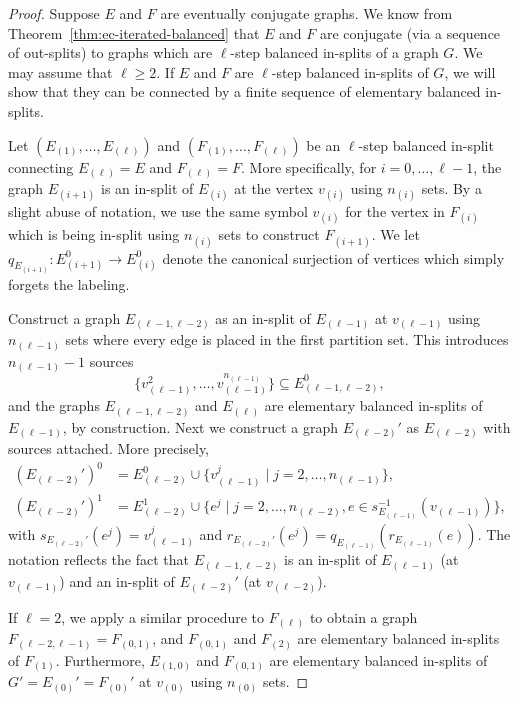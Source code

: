 \documentclass[12pt,a4paper,oneside,reqno,final]{amsart}
\newcommand{\LRA}{\longrightarrow}
\let\geq\geqslant{}
\let\subset\subseteq{}
\theoremstyle{definition}
\numberwithin{equation}{section} %
\begin{document}
\begin{proof}
    Suppose $E$ and $F$ are eventually conjugate graphs.
    We know from Theorem~\ref{thm:ec-iterated-balanced} that $E$ and $F$ are conjugate (via a sequence of out-splits) to graphs which
    are $\ell$-step balanced in-splits of a graph $G$.
    We may assume that $\ell\geq 2$.
    If $E$ and $F$ are $\ell$-step balanced in-splits of $G$,
    we will show that they can be connected by a finite sequence of elementary balanced in-splits.

    Let $(E_{(1)}, \ldots,E_{(\ell)})$ and $(F_{(1)}, \ldots,F_{(\ell)})$ be an $\ell$-step balanced in-split connecting $E_{(\ell)} = E$ and $F_{(\ell)} = F$.
    More specifically, for $i = 0,\ldots,\ell - 1$, the graph $E_{(i + 1)}$ is an in-split of $E_{(i)}$ at the vertex $v_{(i)}$ using $n_{(i)}$ sets.
    By a slight abuse of notation, we use the same symbol $v_{(i)}$ for the vertex in $F_{(i)}$ which is being in-split using $n_{(i)}$ sets to construct $F_{(i + 1)}$.
    We let $q_{E_{(i + 1)}}\colon E_{(i + 1)}^0 \LRA E_{(i)}^0$ denote the canonical surjection of vertices which simply forgets the labeling.

    Construct a graph $E_{(\ell - 1, \ell - 2)}$ as an in-split of $E_{(\ell - 1)}$ at $v_{(\ell - 1)}$ using $n_{(\ell - 1)}$ sets
    where every edge is placed in the first partition set.
    This introduces $n_{(\ell - 1)} - 1$ sources
    \[
        \{v_{(\ell - 1)}^2,\ldots,v_{(\ell - 1)}^{n_{(\ell - 1)}}\} \subset E_{(\ell - 1, \ell - 2)}^0,
    \]
    and the graphs $E_{(\ell - 1, \ell - 2)}$ and $E_{(\ell)}$ are elementary balanced in-splits of $E_{(\ell - 1)}$, by construction.
    Next we construct a graph $E_{(\ell - 2)}'$ as $E_{(\ell - 2)}$ with sources attached.
    More precisely, 
    \begin{align*}
        {(E_{(\ell - 2)}')}^0 &= E_{(\ell - 2)}^0 \cup \{v_{(\ell - 1)}^j \mid j = 2, \ldots, n_{(\ell - 1)} \},  \\
        {(E_{(\ell - 2)}')}^1 &= E_{(\ell - 2)}^1 \cup \{ e^j \mid  j = 2,\ldots,n_{(\ell - 2)}, e\in s_{E_{(\ell - 1)}}^{-1}(v_{(\ell - 1)}) \},
    \end{align*}
    with $s_{E_{(\ell - 2)}'}(e^j) = v_{(\ell - 1)}^j$ and $r_{E_{(\ell - 2)}'}(e^j) = q_{E_{(\ell - 1)}}(r_{E_{(\ell - 1)}}(e))$.
    The notation reflects the fact that $E_{(\ell - 1, \ell - 2)}$ is an in-split of $E_{(\ell - 1)}$ (at $v_{(\ell - 1)}$) 
    and an in-split of $E_{(\ell - 2)}'$ (at $v_{(\ell - 2)}$).

    If $\ell = 2$, we apply a similar procedure to $F_{(\ell)}$ to obtain a graph $F_{(\ell - 2, \ell - 1)} = F_{(0,1)}$,
    and $F_{(0,1)}$ and $F_{(2)}$ are elementary balanced in-splits of $F_{(1)}$.
    Furthermore, $E_{(1,0)}$ and $F_{(0,1)}$ are elementary balanced in-splits of $G' = E_{(0)}' = F_{(0)}'$ at $v_{(0)}$ using $n_{(0)}$ sets.


\end{proof}
\end{document}
